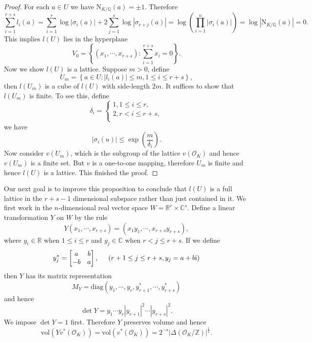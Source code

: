 \begin{proof}
For each $a\in U$ we have $\mathrm{N}_{K/\mathbb{Q}}(a)=\pm 1$. Therefore 
$$
\sum_{i=1}^{r+s}{l_i\left( a \right)}=\sum_{i=1}^r{\log \left| \sigma _i\left( a \right) \right|}+2\sum_{j=1}^s{\log \left| \sigma _{r+j}\left( a \right) \right|}=\log \left( \prod_{i=1}^n{\left| \sigma _i\left( a \right) \right|} \right) =\log \left| \mathrm{N}_{K/\mathbb{Q}}\left( a \right) \right|=0.
$$
This implies $l(U)$ lies in the hyperplane 
$$
V_0=\left\{ \left( x_1,\cdots ,x_{r+s} \right) :\sum_{i=1}^{r+s}{x_i=0} \right\} .
$$
Now we show $l(U)$ is a lattice. Suppose $m>0$, define 
$$
U_m=\left\{ a\in U:\left| l_i\left( a \right) \right|\le m,1\le i\le r+s \right\} ,
$$
then $l(U_m)$ is a cube of $l(U)$ with side-length $2m$. It suffices to show that $l(U_m)$ is finite. To see this, define 
$$
\delta _i=\begin{cases}
	1,1\le i\le r,\\
	2,r<i\le r+s,\\
\end{cases}
$$
we have 
$$
\left| \sigma _i\left( u \right) \right|\le \exp \left( \frac{m}{\delta _i} \right) .
$$
Now consider $v(U_m)$, which is the subgroup of the lattice $v(\mathcal{O}_K)$ and hence $v(U_m)$ is a finite set. But $v$ is a one-to-one mapping, therefore $U_m$ is finite and hence $l(U)$ is a lattice. This finished the proof.
\end{proof}
Our next goal is to improve this proposition to conclude that $l(U)$ is a full lattice in the $r+s-1$ dimensional subspace rather than just contained in it. We first work in the $n$-dimensional real vector space $W=\mathbb{R}^r\times\mathbb{C}^s$. Define a linear transformation $Y$ on $W$ by the rule 
$$
Y\left( x_1,\cdots ,x_{r+s} \right) =\left( x_1y_1,\cdots ,x_{r+s}y_{r+s} \right) ,
$$
where $y_i\in\mathbb{R}$ when $1\le i\le r$ and $y_j\in\mathbb{C}$ when $r<j\le r+s$. If we define 
$$
y_{j}^{*}=\left[ \begin{matrix}
	a&		b\\
	-b&		a\\
\end{matrix} \right] ,\hspace{0.5cm}\left( r+1\le j\le r+s,y_j=a+b\mathrm{i} \right) 
$$
then $Y$ has its matrix representation 
$$
M_Y=\mathrm{diag}\left( y_1,\cdots ,y_r,y_{r+1}^{*},\cdots ,y_{r+s}^{*} \right) 
$$
and hence 
$$
\det Y=y_1\cdots y_r\left| y_{r+1} \right|^2\cdots \left| y_{r+s} \right|^2.
$$
We impose $\det Y=1$ first. Therefore $Y$ preserves volume and hence 
$$
\mathrm{vol}\left( Yv^*\left( \mathcal{O} _K \right) \right) =\mathrm{vol}\left( v^*\left( \mathcal{O} _K \right) \right) =2^{-s}\left| \Delta \left( \mathcal{O} _K/\mathbb{Z} \right) \right|^{\frac{1}{2}}.
$$
